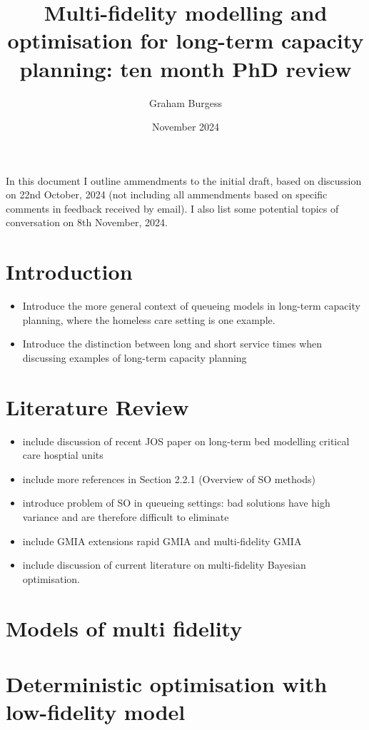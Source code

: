 \documentclass[12pt,a4paper]{article}
\title{Multi-fidelity modelling and optimisation for long-term capacity planning: ten month PhD review}
\author{Graham Burgess}
\date{November 2024}
\begin{document}
%
\maketitle
%

In this document I outline ammendments to the initial draft, based on discussion on 22nd October, 2024 (not including all ammendments based on specific comments in feedback received by email). I also list some potential topics of conversation on 8th November, 2024. 

\section{Introduction}
%
\begin{itemize}[noitemsep]
\item Introduce the more general context of queueing models in long-term capacity planning, where the homeless care setting is one example. 
\item Introduce the distinction between long and short service times when discussing examples of long-term capacity planning
\end{itemize}
%
\section{Literature Review} \label{lit-rev}
%
\begin{itemize}[noitemsep]
\item include discussion of recent JOS paper on long-term bed modelling critical care hosptial units
\item include more references in Section 2.2.1 (Overview of SO methods)
\item introduce problem of SO in queueing settings: bad solutions have high variance and are therefore difficult to eliminate
\item include GMIA extensions rapid GMIA and multi-fidelity GMIA
\item include discussion of current literature on multi-fidelity Bayesian optimisation.
\end{itemize}
%
\section{Models of multi fidelity} \label{models}

\section{Deterministic optimisation with low-fidelity model} \label{do}
\end{document}

